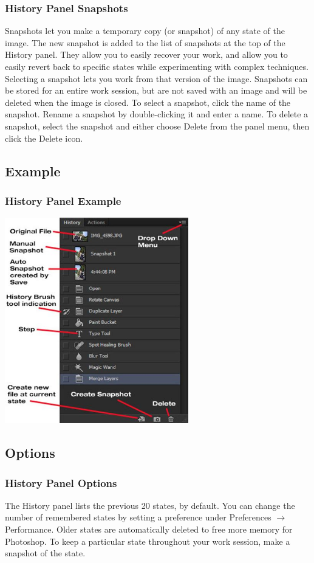 \documentclass{beamer}
\begin{document}
	\begin{frame}
	\frametitle{History Panel Snapshots}
	\begin{outline}
		\1 Snapshots let you make a temporary copy (or snapshot) of any state of the image. 
		\1 The new snapshot is added to the list of snapshots at the top of the History panel. They allow you to easily recover your work, and allow you to easily revert back to specific states while experimenting with complex techniques.  
		\1 Selecting a snapshot lets you work from that version of the image.
		\1 Snapshots can be stored for an entire work session, but are not saved with an image and will be deleted when the image is closed.
		\1 To select a snapshot, click the name of the snapshot.		
		\1 Rename a snapshot by double-clicking it and enter a name.
		\1 To delete a snapshot, select the snapshot and either choose Delete from the panel menu, then click the Delete icon.
	\end{outline}
\end{frame}

\subsection{Example}		
	\begin{frame}
		\frametitle{History Panel Example}
		\begin{center}
			\includegraphics[width=0.6\textwidth]{images/history panel.png}
		\end{center}
	\end{frame}

\subsection{Options}		
	\begin{frame}
		\frametitle{History Panel Options}
		\begin{outline}
			\1 The History panel lists the previous 20 states, by default. 
			\2 You can change the number of remembered states by setting a preference under Preferences $\rightarrow$ Performance. 
			\2 Older states are automatically deleted to free more memory for Photoshop. 
			\2 To keep a particular state throughout your work session, make a snapshot of the state.
		\end{outline}
	\end{frame}
\end{document}
